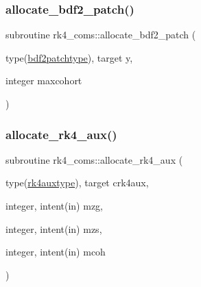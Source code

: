 \mbox{\label{namespacerk4__coms_a292fa2f7c65668f516015eff1a3b74e2}} 
\subsubsection{\texorpdfstring{allocate\+\_\+bdf2\+\_\+patch()}{allocate\_bdf2\_patch()}}
{\footnotesize\ttfamily subroutine rk4\+\_\+coms\+::allocate\+\_\+bdf2\+\_\+patch (\begin{DoxyParamCaption}\item[{type(\hyperlink{structrk4__coms_1_1bdf2patchtype}{bdf2patchtype}), target}]{y,  }\item[{integer}]{maxcohort }\end{DoxyParamCaption})}

\mbox{\label{namespacerk4__coms_afe1de3958c4ca4c64d5fb2160fced95f}} 
\subsubsection{\texorpdfstring{allocate\+\_\+rk4\+\_\+aux()}{allocate\_rk4\_aux()}}
{\footnotesize\ttfamily subroutine rk4\+\_\+coms\+::allocate\+\_\+rk4\+\_\+aux (\begin{DoxyParamCaption}\item[{type(\hyperlink{structrk4__coms_1_1rk4auxtype}{rk4auxtype}), target}]{crk4aux,  }\item[{integer, intent(in)}]{mzg,  }\item[{integer, intent(in)}]{mzs,  }\item[{integer, intent(in)}]{mcoh }\end{DoxyParamCaption})}


